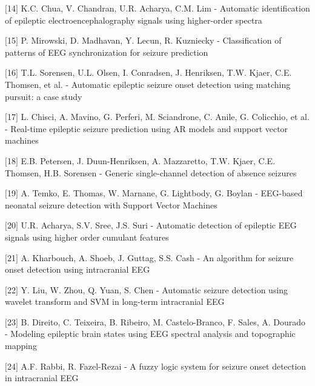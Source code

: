 \documentclass{llncs}       %
\begin{document}
\begin{thebibliography}{}
$[$14$]$ K.C. Chua, V. Chandran, U.R. Acharya, C.M. Lim - Automatic 
identification of epileptic electroencephalography signals using 
higher-order spectra

$[$15$]$ P. Mirowski, D. Madhavan, Y. Lecun, R. Kuzniecky - 
Classification of patterns of EEG synchronization for seizure prediction

$[$16$]$ T.L. Sorensen, U.L. Olsen, I. Conradsen, J. Henriksen, T.W. 
Kjaer, C.E. Thomsen, et al. - Automatic epileptic seizure onset 
detection using matching pursuit: a case study

$[$17$]$ L. Chisci, A. Mavino, G. Perferi, M. Sciandrone, C. Anile, G. 
Colicchio, et al. - Real-time epileptic seizure prediction using AR 
models and support vector machines

$[$18$]$ E.B. Petersen, J. Duun-Henriksen, A. Mazzaretto, T.W. Kjaer, 
C.E. Thomsen, H.B. Sorensen - Generic single-channel detection of 
absence seizures

$[$19$]$ A. Temko, E. Thomas, W. Marnane, G. Lightbody, G. Boylan - 
EEG-based neonatal seizure detection with Support Vector Machines

$[$20$]$ U.R. Acharya, S.V. Sree, J.S. Suri - Automatic detection of 
epileptic EEG signals using higher order cumulant features

$[$21$]$ A. Kharbouch, A. Shoeb, J. Guttag, S.S. Cash - An algorithm for 
seizure onset detection using intracranial EEG

$[$22$]$ Y. Liu, W. Zhou, Q. Yuan, S. Chen - Automatic seizure detection 
using wavelet transform and SVM in long-term intracranial EEG

$[$23$]$ B. Direito, C. Teixeira, B. Ribeiro, M. Castelo-Branco, F. 
Sales, A. Dourado - Modeling epileptic brain states using EEG spectral 
analysis and topographic mapping

$[$24$]$ A.F. Rabbi, R. Fazel-Rezai - A fuzzy logic system for seizure 
onset detection in intracranial EEG






\end{thebibliography}
\end{document}
